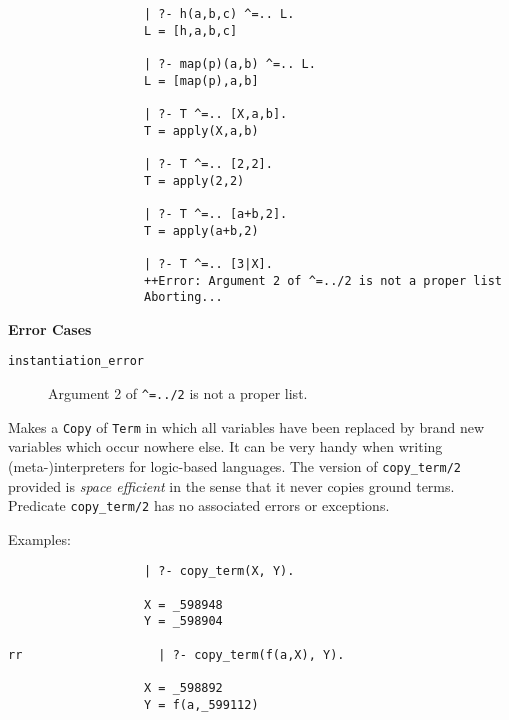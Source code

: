 \begin{description}
\begin{itemize}
{\begin{verbatim}
                   | ?- h(a,b,c) ^=.. L.
                   L = [h,a,b,c]

                   | ?- map(p)(a,b) ^=.. L.
                   L = [map(p),a,b]

                   | ?- T ^=.. [X,a,b].
                   T = apply(X,a,b)

                   | ?- T ^=.. [2,2].
                   T = apply(2,2)

                   | ?- T ^=.. [a+b,2].
                   T = apply(a+b,2)

                   | ?- T ^=.. [3|X].
                   ++Error: Argument 2 of ^=../2 is not a proper list
                   Aborting...
     \end{verbatim}}

{\bf Error Cases}
     \begin{description}
     \item[{\tt instantiation\_error}]
	Argument 2 of {\tt \verb|^|=../2} is not a proper list.
     \end{description}

    Makes a {\tt Copy} of {\tt Term} in which all variables have been
    replaced by brand new variables which occur nowhere else. It can
    be very handy when writing (meta-)interpreters for logic-based
    languages.  The version of {\tt copy\_term/2} provided is {\em space
    efficient} in the sense that it never copies ground terms. 
    Predicate {\tt copy\_term/2} has no associated errors or exceptions.

    Examples:
    {\footnotesize
     \begin{verbatim}
                   | ?- copy_term(X, Y).

                   X = _598948
                   Y = _598904

rr                   | ?- copy_term(f(a,X), Y).

                   X = _598892
                   Y = f(a,_599112)
     \end{verbatim}}


\end{itemize}
\end{description}

